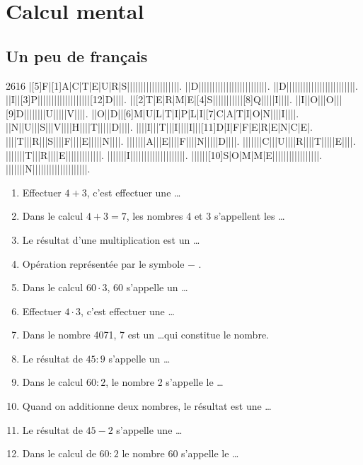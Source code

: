 \documentclass[syllabus_1.tex]{subfiles}
\begin{document}
\chapter{Calcul mental}
\section{Un peu de français}
\begin{Puzzle}{26}{16}
    |[5]F|[1]A|C|T|E|U|R|S|{}|{}|{}|{}|{}|{}|{}|{}|{}|{}|{}|{}|{}|{}|{}|{}|{}|{}|.
    |{}|D|{}|{}|{}|{}|{}|{}|{}|{}|{}|{}|{}|{}|{}|{}|{}|{}|{}|{}|{}|{}|{}|{}|{}|{}|.
    |{}|D|{}|{}|{}|{}|{}|{}|{}|{}|{}|{}|{}|{}|{}|{}|{}|{}|{}|{}|{}|{}|{}|{}|{}|{}|.
    |{}|I|{}|[3]P|{}|{}|{}|{}|{}|{}|{}|{}|{}|{}|{}|{}|{}|{}|{}|{}|{}|{}|[12]D|{}|{}|{}|.
    |{}|[2]T|E|R|M|E|[4]S|{}|{}|{}|{}|{}|{}|{}|{}|{}|{}|[8]Q|{}|{}|{}|{}|I|{}|{}|{}|.
    |{}|I|{}|O|{}|{}|O|{}|{}|[9]D|{}|{}|{}|{}|{}|{}|{}|U|{}|{}|{}|{}|V|{}|{}|{}|.
    |{}|O|{}|D|{}|[6]M|U|L|T|I|P|L|I|[7]C|A|T|I|O|N|{}|{}|{}|I|{}|{}|{}|.
    |{}|N|{}|U|{}|{}|S|{}|{}|V|{}|{}|{}|H|{}|{}|{}|T|{}|{}|{}|{}|D|{}|{}|{}|.
    |{}|{}|{}|I|{}|{}|T|{}|{}|I|{}|{}|{}|I|{}|{}|[11]D|I|F|F|E|R|E|N|C|E|.
    |{}|{}|{}|T|{}|{}|R|{}|{}|S|{}|{}|{}|F|{}|{}|{}|E|{}|{}|{}|{}|N|{}|{}|{}|.
    |{}|{}|{}|{}|{}|{}|A|{}|{}|E|{}|{}|{}|F|{}|{}|{}|N|{}|{}|{}|{}|D|{}|{}|{}|.
    |{}|{}|{}|{}|{}|{}|C|{}|{}|U|{}|{}|{}|R|{}|{}|{}|T|{}|{}|{}|{}|E|{}|{}|{}|.
    |{}|{}|{}|{}|{}|{}|T|{}|{}|R|{}|{}|{}|E|{}|{}|{}|{}|{}|{}|{}|{}|{}|{}|{}|{}|.
    |{}|{}|{}|{}|{}|{}|I|{}|{}|{}|{}|{}|{}|{}|{}|{}|{}|{}|{}|{}|{}|{}|{}|{}|{}|{}|.
    |{}|{}|{}|{}|{}|[10]S|O|M|M|E|{}|{}|{}|{}|{}|{}|{}|{}|{}|{}|{}|{}|{}|{}|{}|{}|.
    |{}|{}|{}|{}|{}|{}|N|{}|{}|{}|{}|{}|{}|{}|{}|{}|{}|{}|{}|{}|{}|{}|{}|{}|{}|{}|.
\end{Puzzle}
\begin{enumerate}[cols=2]
    \item Effectuer $4 + 3$, c'est effectuer une \dots
    \item Dans le calcul $4 + 3 = 7$, les nombres 4 et 3 s'appellent les \dots
    \item Le résultat d'une multiplication est un \dots
    \item Opération représentée par le symbole \og $-$ \fg.
    \item Dans le calcul $60 \cdot 3$, 60 s'appelle un \dots
    \item Effectuer $4 \cdot 3$, c'est effectuer une \dots
    \item Dans le nombre \num{4071}, 7 est un \dots qui constitue le nombre.
    \item Le résultat de $45 : 9$ s'appelle un \dots
    \item Dans le calcul $60 : 2$, le nombre 2 s'appelle le \dots
    \item Quand on additionne deux nombres, le résultat est une \dots
    \item Le résultat de $45 - 2 $ s'appelle une \dots
    \item Dans le calcul de $60 : 2$ le nombre 60 s'appelle le \dots
\end{enumerate}
\end{document}
